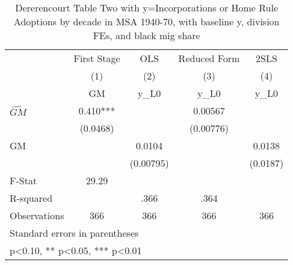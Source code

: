 \begin{table}[htbp]\centering
\def\sym#1{\ifmmode^{#1}\else\(^{#1}\)\fi}
\caption{Dererencourt Table Two with y=Incorporations or Home Rule Adoptions by decade in MSA 1940-70, with baseline y, division FEs, and black mig share}
\begin{tabular}{l*{4}{c}}
\toprule
                    & First Stage   &         OLS   &Reduced Form   &        2SLS   \\
                    &\multicolumn{1}{c}{(1)}&\multicolumn{1}{c}{(2)}&\multicolumn{1}{c}{(3)}&\multicolumn{1}{c}{(4)}\\
                    &\multicolumn{1}{c}{GM}&\multicolumn{1}{c}{y\_L0}&\multicolumn{1}{c}{y\_L0}&\multicolumn{1}{c}{y\_L0}\\
\midrule
$\hat{GM}$          &       0.410***&               &     0.00567   &               \\
                    &    (0.0468)   &               &   (0.00776)   &               \\
\addlinespace
GM                  &               &      0.0104   &               &      0.0138   \\
                    &               &   (0.00795)   &               &    (0.0187)   \\
\midrule
F-Stat              &       29.29   &               &               &               \\
R-squared           &               &        .366   &        .364   &               \\
Observations        &         366   &         366   &         366   &         366   \\
\bottomrule
\multicolumn{5}{l}{\footnotesize Standard errors in parentheses}\\
\multicolumn{5}{l}{\footnotesize * p<0.10, ** p<0.05, *** p<0.01}\\
\end{tabular}
\end{table}

